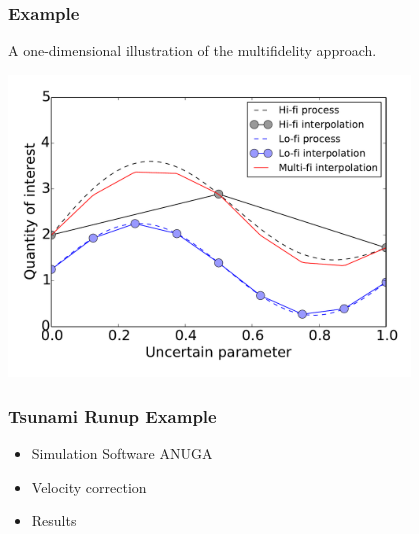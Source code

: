 \documentclass[11pt,ucs]{beamer}
\begin{document}
\begin{frame}\frametitle{Example}

A one-dimensional illustration of the multifidelity approach.

\begin{center}
\includegraphics[width=0.8\textwidth]{method2}
\end{center}


\end{frame}




\begin{frame}\frametitle{Tsunami Runup Example}

\begin{itemize}
\item  Simulation Software ANUGA

\item Velocity correction

\item Results


\end{itemize}

\end{frame}
\end{document}
